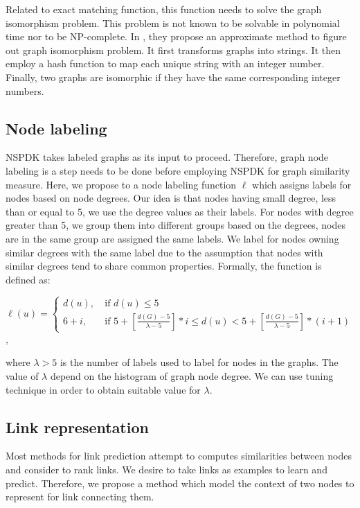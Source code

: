 \documentclass[runningheads,a4paper]{llncs}
\begin{document}
Related to exact matching function, this function needs to solve the graph isomorphism problem. This problem is not known to be solvable in polynomial time nor to be NP-complete. In \cite{nspdk}, they propose an approximate method to figure out graph isomorphism problem. It first transforms graphs into strings. It then employ a hash function to map each unique string with an integer number. Finally, two graphs are isomorphic if they have the same corresponding integer numbers.

\subsection{Node labeling}
NSPDK takes labeled graphs as its input to proceed. Therefore, graph node labeling is a step needs to be done before employing NSPDK for graph similarity measure. Here, we propose to a node labeling function $\ell$ which assigns labels for nodes based on node degrees. Our idea is that nodes having small degree, less than or equal to 5, we use the degree values as their labels. For nodes with degree greater than 5, we group them into different groups based on the degrees, nodes are in the same group are assigned the same labels. We label for nodes owning similar degrees with the same label due to the assumption that nodes with similar degrees tend to share common properties. Formally, the function is defined as:
\begin{center}
$\ell(u) = \left\{
	\begin{array}{ll}
		d(u),\  & \mbox{if } d(u) \leq 5 \\
		6+i,\ & \mbox{if }  5 + \left[ \frac{d(G) - 5}{\lambda-5} \right] *i \leq d(u) < 5 + \left[ \frac{d(G) - 5}{\lambda-5}\right] *(i+1)
	\end{array}
\right.$,
\end{center}
where $\lambda > 5$ is the number of labels used to label for nodes in the graphs. The value of $\lambda$ depend on the histogram of graph node degree. We can use tuning technique in order to obtain suitable value for $\lambda$.
\subsection{Link representation}
Most methods for link prediction attempt to computes similarities between nodes and consider to rank links. We desire to take links as examples to learn and predict. Therefore, we propose a method which model the context of two nodes to represent for link connecting them.
\end{document}
